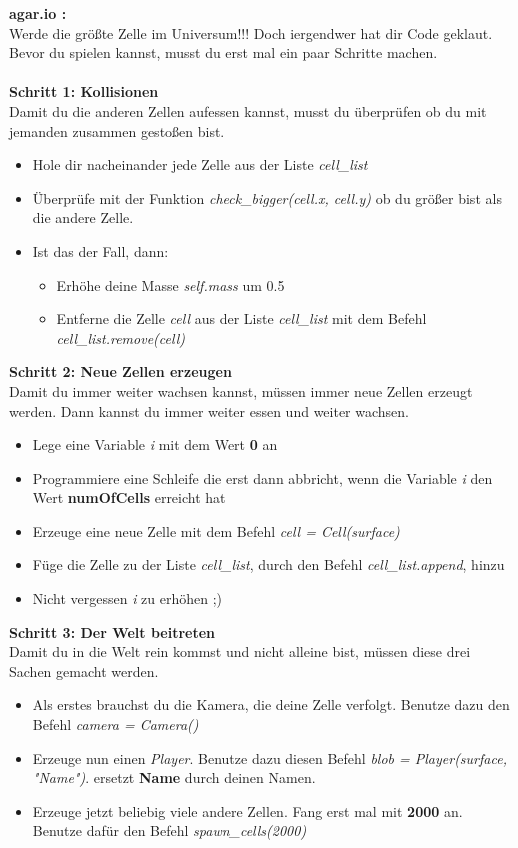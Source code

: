\textbf{\large agar.io :}\\
Werde die größte Zelle im Universum!!! Doch iergendwer hat dir Code geklaut. Bevor du spielen kannst, musst du erst mal ein paar Schritte machen.\\\\
\textbf{Schritt 1: Kollisionen}\\
Damit du die anderen Zellen aufessen kannst, musst du überprüfen ob du mit jemanden zusammen gestoßen bist.
\begin{itemize}
	\item Hole dir nacheinander jede Zelle aus der Liste \textit{cell\_list}
	\item Überprüfe mit der Funktion \textit{check\_bigger(cell.x, cell.y)} ob du größer bist als die andere Zelle.
	\item Ist das der Fall, dann:
	\begin{itemize}
		\item Erhöhe deine Masse \textit{self.mass} um 0.5
		\item Entferne die Zelle \textit{cell} aus der Liste \textit{cell\_list} mit dem Befehl \textit{cell\_list.remove(cell)}
	\end{itemize}
	\end{itemize}
\textbf{Schritt 2: Neue Zellen erzeugen}\\
Damit du immer weiter wachsen kannst, müssen immer neue Zellen erzeugt werden. Dann kannst du immer weiter essen und weiter wachsen.
\begin{itemize}
	\item Lege eine Variable \textit{i} mit dem Wert \textbf{0} an
	\item Programmiere eine Schleife die erst dann abbricht, wenn die Variable \textit{i} den Wert \textbf{numOfCells} erreicht hat
	\item Erzeuge eine neue Zelle mit dem Befehl \textit{cell = Cell(surface)}
	\item Füge die Zelle zu der Liste \textit{cell\_list}, durch den Befehl \textit{cell\_list.append}, hinzu
	\item Nicht vergessen \textit{i} zu erhöhen ;)
\end{itemize}
\textbf{Schritt 3: Der Welt beitreten}\\
Damit du in die Welt rein kommst und nicht alleine bist, müssen diese drei Sachen gemacht werden.
\begin{itemize}
	\item Als erstes brauchst du die Kamera, die deine Zelle verfolgt. Benutze dazu den Befehl \textit{camera = Camera()}
	\item Erzeuge nun einen \textit{Player}. Benutze dazu diesen Befehl \textit{blob = Player(surface, "Name")}. ersetzt \textbf{Name} durch deinen Namen.
	\item Erzeuge jetzt beliebig viele andere Zellen. Fang erst mal mit \textbf{2000} an. Benutze dafür den Befehl \textit{spawn\_cells(2000)}
\end{itemize}
